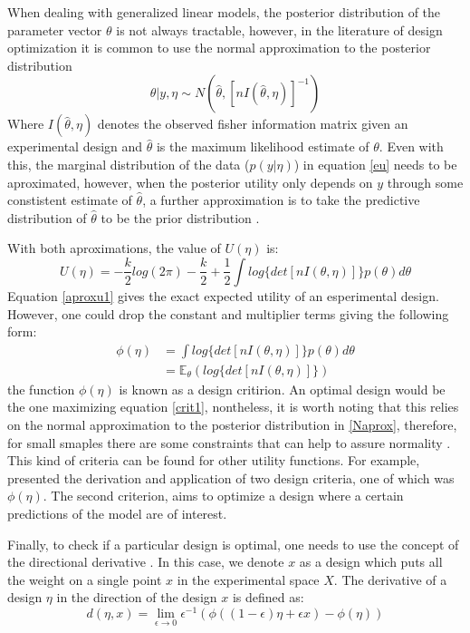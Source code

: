 \documentclass[preprint,review,12pt]{elsarticle}
\begin{document}
When dealing with generalized linear models, the posterior distribution of the parameter vector $\theta$ is not always tractable, however, in the literature of design optimization it is common to use the normal approximation to the posterior distribution
\begin{equation}
\theta|y,\eta \sim N\left(\hat{\theta},[nI(\hat{\theta},\eta)]^{-1}\right)
\label{Naprox}
\end{equation}
Where $I(\hat{\theta},\eta)$ denotes the observed fisher information matrix given an experimental design and $\hat{\theta}$ is the maximum likelihood estimate of $\theta$. Even with this, the marginal distribution of the data ($p(y|\eta)$) in equation \ref{eu} needs to be aproximated, however, when the posterior utility only depends on $y$ through some constistent estimate of $\hat{\theta}$, a further approximation is to take the predictive distribution of  $\hat{\theta}$ to be the prior distribution \cite{chalar1989}.

With both aproximations, the value of $U(\eta)$ is:
\begin{equation}
U(\eta)=-\frac{k}{2}log(2\pi)-\frac{k}{2}+\frac{1}{2} \int log \{det[nI(\theta,\eta)]\} p(\theta) d\theta
\label{aproxu1}
\end{equation}
Equation \ref{aproxu1} gives the exact expected utility of an esperimental design. However, one could drop the constant and multiplier terms giving the following form:
\begin{align}
\phi(\eta) & = \int log \{det[nI(\theta,\eta)]\} p(\theta) d\theta \\
           & = \mathbb{E}_\theta \left( log\{det[nI(\theta,\eta)]\} \right)
\label{crit1}
\end{align}
the function $\phi(\eta)$ is known as a design critirion. An optimal design would be the one maximizing equation \ref{crit1}, nontheless, it is worth noting that this relies on the normal approximation to the posterior distribution in \ref{Naprox}, therefore, for small smaples there are some constraints that can help to assure normality \citep[see][]{CLCH2002}. This kind of criteria can be found for other utility functions. For example, \citet{chalar1989} presented the derivation and application of two design criteria, one of which was $\phi(\eta)$. The second criterion, aims to optimize a design where a certain predictions of the model are of interest.

Finally, to check if a particular design is optimal, one needs to use the concept of the directional derivative \citep[see][]{chalar1989}. In this case, we denote $x$ as a design which puts all the weight on a single point $x$ in the experimental space $X$. The derivative of a design $\eta$ in the direction of the design $x$ is defined as:
\begin{equation}
d(\eta,x)=\lim_{\epsilon\to 0} \epsilon^{-1}(\phi((1-\epsilon) \eta+\epsilon x)-\phi(\eta))
\end{equation}
\end{document}

